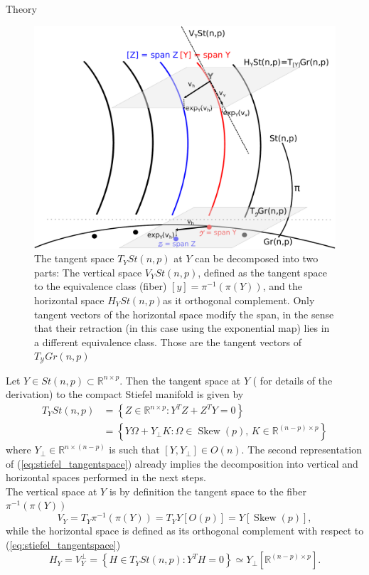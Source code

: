 \begin{chapter}{Theory}
\begin{figure}[h!]
        \centering
	    \includegraphics[width=0.6\linewidth]{./figures/theory/quotienttangentspace.pdf}
	\caption[Vertical and horizontal spaces]{ The tangent space $T_YSt(n,p)$ at $Y$ can be decomposed into 
	two parts: The vertical space $V_YSt(n,p)$, defined as the tangent space to the equivalence class (fiber) 
	$[y]=\pi^{-1}(\pi(Y))$, and the horizontal space $H_YSt(n,p)$as it orthogonal complement. Only tangent vectors of the horizontal space modify the span, 
	in the sense that their retraction (in this case using the exponential map) lies in a different equivalence class.
	Those are the tangent vectors of $T_{\mathcal{Y}}Gr(n,p)$
	}
	\label{fig:horizontalspace}
\end{figure}


Let $Y\in St(n,p)\subset\mathbb{R}^{n\times p}$. Then the tangent space at $Y$ (\cite{Absil2009} for details of the derivation) to the compact Stiefel manifold is given by
\begin{align}
    \label{eq:stiefel_tangentspace}
   T_YSt(n,p)	&= \left\lbrace Z\in\mathbb{R}^{n\times p}: Y^TZ+Z^TY=0 \right\rbrace\\
   &=  \left\lbrace Y\Omega + Y_{\bot}K: \Omega\in\operatorname{Skew}(p),\, K\in\mathbb{R}^{(n-p)\times p} \right\rbrace\nonumber
\end{align}
where $Y_{\bot}\in\mathbb{R}^{n\times (n-p)}$ is such that $[Y,Y_{\bot}]\in O(n)$. The second representation of (\ref{eq:stiefel_tangentspace})
already implies the decomposition into vertical and horizontal spaces performed in the next steps.\\

The vertical space at $Y$ is by definition the tangent space to the fiber $\pi^{-1}(\pi(Y))$
\begin{equation}
    \label{eq:stiefel_horizontalspace}
    V_Y = T_Y\pi^{-1}(\pi(Y))=T_YY[O(p)]=Y[\operatorname{Skew}(p)],
\end{equation}
while the horizontal space is defined as its orthogonal complement with respect to (\ref{eq:stiefel_tangentspace})
\begin{equation}
    \label{eq:stiefel_verticalspace}
    H_Y=V_Y^{\bot} =\left\lbrace H\in T_Y St(n,p):Y^TH=0 \right\rbrace \simeq Y_{\bot}[\mathbb{R}^{(n-p)\times p}].
\end{equation}


\end{chapter}
